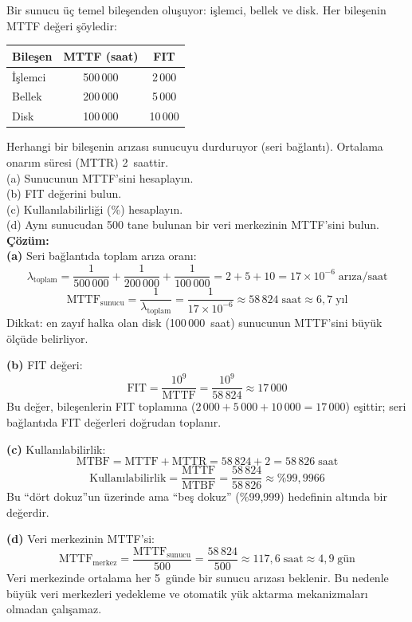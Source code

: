 \begin{ornek}[1.7]
Bir sunucu üç temel bileşenden oluşuyor: işlemci, bellek ve disk. Her bileşenin MTTF değeri şöyledir:
\begin{center}
\small
\begin{tabular}{@{}lcc@{}}
\toprule
\textbf{Bileşen} & \textbf{MTTF (saat)} & \textbf{FIT} \\
\midrule
İşlemci  & 500\,000 & 2\,000 \\
Bellek   & 200\,000 & 5\,000 \\
Disk     & 100\,000 & 10\,000 \\
\bottomrule
\end{tabular}
\end{center}

\noindent Herhangi bir bileşenin arızası sunucuyu durduruyor (seri bağlantı). Ortalama onarım süresi (MTTR) 2~saattir.\\[4pt]
(a) Sunucunun MTTF'sini hesaplayın.\\
(b) FIT değerini bulun.\\
(c) Kullanılabilirliği (\%) hesaplayın.\\
(d) Aynı sunucudan 500 tane bulunan bir veri merkezinin MTTF'sini bulun.\\[6pt]
\textbf{Çözüm:}\\[2pt]
\textbf{(a)} Seri bağlantıda toplam arıza oranı:
\[
\lambda_{\text{toplam}} = \frac{1}{500\,000} + \frac{1}{200\,000} + \frac{1}{100\,000} = 2 + 5 + 10 = 17 \times 10^{-6}\;\text{arıza/saat}
\]
\[
\text{MTTF}_{\text{sunucu}} = \frac{1}{\lambda_{\text{toplam}}} = \frac{1}{17 \times 10^{-6}} \approx 58\,824\;\text{saat} \approx 6{,}7\;\text{yıl}
\]
Dikkat: en zayıf halka olan disk (100\,000~saat) sunucunun MTTF'sini büyük ölçüde belirliyor.

\textbf{(b)} FIT değeri:
\[
\text{FIT} = \frac{10^9}{\text{MTTF}} = \frac{10^9}{58\,824} \approx 17\,000
\]
Bu değer, bileşenlerin FIT toplamına ($2\,000 + 5\,000 + 10\,000 = 17\,000$) eşittir; seri bağlantıda FIT değerleri doğrudan toplanır.

\textbf{(c)} Kullanılabilirlik:
\[
\text{MTBF} = \text{MTTF} + \text{MTTR} = 58\,824 + 2 = 58\,826\;\text{saat}
\]
\[
\text{Kullanılabilirlik} = \frac{\text{MTTF}}{\text{MTBF}} = \frac{58\,824}{58\,826} \approx \%99{,}9966
\]
Bu ``dört dokuz''un üzerinde ama ``beş dokuz'' (\%99,999) hedefinin altında bir değerdir.

\textbf{(d)} Veri merkezinin MTTF'si:
\[
\text{MTTF}_{\text{merkez}} = \frac{\text{MTTF}_{\text{sunucu}}}{500} = \frac{58\,824}{500} \approx 117{,}6\;\text{saat} \approx 4{,}9\;\text{gün}
\]
Veri merkezinde ortalama her 5~günde bir sunucu arızası beklenir. Bu nedenle büyük veri merkezleri yedekleme ve otomatik yük aktarma mekanizmaları olmadan çalışamaz.
\end{ornek}

